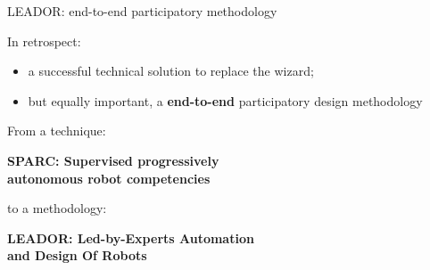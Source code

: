 \documentclass[xcolor=table]{beamer}
\begin{document}
{
\begin{frame}{LEADOR: end-to-end participatory methodology}

    In retrospect:

    \begin{itemize}
        \item a successful technical solution to replace the wizard;
        \item but equally important, a \textbf{end-to-end} participatory design
            methodology
    \end{itemize}

    \pause

        From a technique:

        \textbf{SPARC: Supervised progressively \\autonomous robot
        competencies}

        to a methodology: 

        \textbf{LEADOR: Led-by-Experts Automation \\and Design Of Robots}


\end{frame}
}
\end{document}
